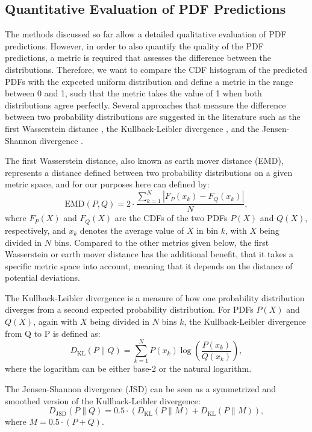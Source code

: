 \documentclass[BCOR=1mm, DIV=calc,10pt,
twoside=true,
twocolumn,
headings=normal]{scrartcl}
\begin{document}
\subsection{Quantitative Evaluation of PDF Predictions}
\label{sec:cdf_acc}

The methods discussed  so far allow a detailed qualitative evaluation of PDF predictions. However, in order to also quantify the quality of the PDF predictions, a metric is required that assesses the difference between the distributions. Therefore, we want to compare the CDF histogram of the predicted PDFs with the expected  uniform distribution and define a metric in the range between 0 and 1, such that the metric takes the value of 1 when both distributions agree perfectly. Several approaches that measure the difference between two probability distributions are suggested in the literature such as  the first Wasserstein distance \cite{olkin1982}, the Kullback-Leibler divergence \cite{kullback1951}, and the Jensen-Shannon divergence  \cite{dagan1997}.

The first Wasserstein distance, also known as earth mover distance (EMD), represents a distance  defined between two probability distributions on a given metric space, and for our purposes here can defined by:
\begin{equation}
\text{EMD}(P, Q) = 2 \cdot \frac{\sum_{k=1}^N |F_P(x_k) - F_Q(x_k)|}{N},
\end{equation}
where $F_P(X)$ and $F_Q(X)$ are the CDFs of the two PDFs $P(X)$ and $Q(X)$, respectively, and $x_k$ denotes the average value of $X$ in bin $k$, with $X$ being divided in $N$ bins. Compared to the other metrics given below, the first Wasserstein or earth mover distance has the additional benefit, that it takes a specific metric space into account, meaning that it depends on the distance of potential deviations.

The Kullback-Leibler divergence is a measure of how one probability distribution diverges from a second expected probability distribution. For PDFs $P(X)$ and $Q(X)$, again with $X$ being divided in $N$ bins $k$, the Kullback-Leibler divergence from Q to P is defined as:
\begin{equation}
D_{\text{KL}}(P \parallel Q) = \sum _{k=1}^N P(x_k) \log \left({\frac{P(x_k)}{Q(x_k)}}\right),
\end{equation}
where the logarithm can be either base-2 or the natural logarithm.

The Jensen-Shannon divergence (JSD) can be seen as a symmetrized and smoothed version of the Kullback-Leibler divergence:
\begin{equation}
D_{\text{JSD}}(P \parallel Q) = 0.5  \cdot (D_{\text{KL}}(P \parallel M) + D_{\text{KL}}(P \parallel M)),
\end{equation}
where $M = 0.5  \cdot (P + Q)$.
\end{document}
